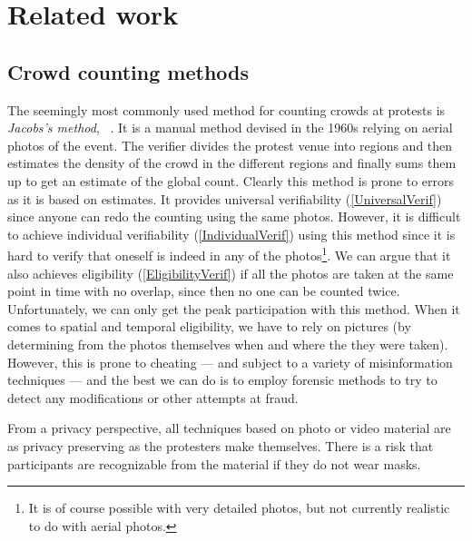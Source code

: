 \section{Related work}%
\label{RelatedWork}

\subsection{Crowd counting methods}

The seemingly most commonly used method for counting crowds at protests is 
\emph{Jacobs's method}, \cf~\cite{%
  2016DemonstrationsInSeoul,%
  BBCHowToCountProtestNumbers,%
  HowWillWeKnowTrumpInauguralCrowdSize,%
  TheXManMarch,%
  TheCrowdNumbersGame,%
}.
It is a manual method devised in the 1960s relying on aerial photos of the event.
The verifier divides the protest venue into regions and then estimates the density of the crowd in the different regions and finally sums them up to get an estimate of the global count.
Clearly this method is prone to errors as it is based on estimates.
It provides universal verifiability (\cref{UniversalVerif}) since anyone can redo the counting using the same photos.
However, it is difficult to achieve individual verifiability (\cref{IndividualVerif}) using this method since it is hard to verify that oneself is indeed in any of the photos\footnote{It is of course possible with very detailed photos, but not currently realistic to do with aerial photos.}.
We can argue that it also achieves eligibility (\cref{EligibilityVerif}) if all the photos are taken at the same point in time with no overlap, since then no one can be counted twice.
Unfortunately, we can only get the peak participation with this method.
When it comes to spatial and temporal eligibility, we have to rely on pictures (\eg by determining from the photos themselves when and where the they were taken).
However, this is prone to cheating --- and subject to a variety of 
misinformation techniques --- and the best we can do is to employ forensic 
methods to try to detect any modifications or other attempts at fraud.

From a privacy perspective, all techniques based on photo or video material are 
as privacy preserving as the protesters make themselves.
There is a risk that participants are recognizable from the material if they do 
not wear masks.

